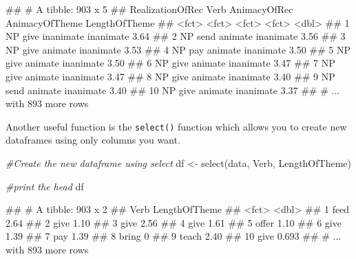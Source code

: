 \documentclass[
]{book}
\newenvironment{Shaded}{\begin{snugshade}}{\end{snugshade}}
\newcommand{\CommentTok}[1]{\textcolor[rgb]{0.56,0.35,0.01}{\textit{#1}}}
\newcommand{\FunctionTok}[1]{\textcolor[rgb]{0.00,0.00,0.00}{#1}}
\newcommand{\NormalTok}[1]{#1}
\newcommand{\OtherTok}[1]{\textcolor[rgb]{0.56,0.35,0.01}{#1}}
\begin{document}
\begin{Shaded}
\begin{Highlighting}[]
\NormalTok{\#\# \# A tibble: 903 x 5}
\NormalTok{\#\#    RealizationOfRec Verb  AnimacyOfRec AnimacyOfTheme LengthOfTheme}
\NormalTok{\#\#    \textless{}fct\textgreater{}            \textless{}fct\textgreater{} \textless{}fct\textgreater{}        \textless{}fct\textgreater{}                  \textless{}dbl\textgreater{}}
\NormalTok{\#\#  1 NP               give  inanimate    inanimate               3.64}
\NormalTok{\#\#  2 NP               send  animate      inanimate               3.56}
\NormalTok{\#\#  3 NP               give  animate      inanimate               3.53}
\NormalTok{\#\#  4 NP               pay   animate      inanimate               3.50}
\NormalTok{\#\#  5 NP               give  animate      inanimate               3.50}
\NormalTok{\#\#  6 NP               give  animate      inanimate               3.47}
\NormalTok{\#\#  7 NP               give  animate      inanimate               3.47}
\NormalTok{\#\#  8 NP               give  animate      inanimate               3.40}
\NormalTok{\#\#  9 NP               send  animate      inanimate               3.40}
\NormalTok{\#\# 10 NP               give  animate      inanimate               3.37}
\NormalTok{\#\# \# ... with 893 more rows}
\end{Highlighting}
\end{Shaded}

Another useful function is the \texttt{select()} function which allows you to create new dataframes using only columns you want.

\begin{Shaded}
\begin{Highlighting}[]
\CommentTok{\#Create the new dataframe using select}
\NormalTok{df }\OtherTok{\textless{}{-}} \FunctionTok{select}\NormalTok{(data, Verb, LengthOfTheme)}

\CommentTok{\#print the head}
\NormalTok{df}
\end{Highlighting}
\end{Shaded}

\begin{Shaded}
\begin{Highlighting}[]
\NormalTok{\#\# \# A tibble: 903 x 2}
\NormalTok{\#\#    Verb  LengthOfTheme}
\NormalTok{\#\#    \textless{}fct\textgreater{}         \textless{}dbl\textgreater{}}
\NormalTok{\#\#  1 feed          2.64 }
\NormalTok{\#\#  2 give          1.10 }
\NormalTok{\#\#  3 give          2.56 }
\NormalTok{\#\#  4 give          1.61 }
\NormalTok{\#\#  5 offer         1.10 }
\NormalTok{\#\#  6 give          1.39 }
\NormalTok{\#\#  7 pay           1.39 }
\NormalTok{\#\#  8 bring         0    }
\NormalTok{\#\#  9 teach         2.40 }
\NormalTok{\#\# 10 give          0.693}
\NormalTok{\#\# \# ... with 893 more rows}
\end{Highlighting}
\end{Shaded}
\end{document}
